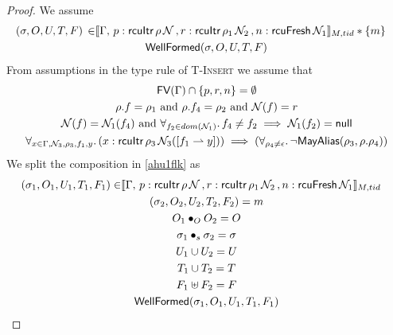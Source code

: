  \begin{proof}
 We assume
\begin{gather}\label{ahu1flk}
  \begin{aligned}
    (\sigma, O, U, T,F) \, \in &  \llbracket \Gamma,\,
 p:\textsf{rcuItr}\, \rho \, \mathcal{N} \, ,
  r:\textsf{rcuItr}\, \rho_1 \, \mathcal{N}_2 \, , n:\textsf{rcuFresh} \, \mathcal{N}_1 \rrbracket_{M,tid} * \{m\}
    \end{aligned} \\
\textsf{WellFormed}(\sigma,O,U,T,F)
\label{ahu2flk}
\end{gather}
From assumptions in the type rule of \textsc{T-Insert} we assume that
\begin{gather}
\textsf{FV}(\Gamma) \cap \{p,r,n\}  =\emptyset 
  \label{ahu3flk} \\
\rho.f  = \rho_1 \text{ and } \rho.f_4  = \rho_2 \text{ and } \mathcal{N}(f) = r
    \label{ahu4flk} \\
\mathcal{N}(f) = \mathcal{N}_1(f_4) \text{ and } \forall_{f_2\in dom(\mathcal{N}_1)} \ldotp f_4 \neq f_2 \implies \mathcal{N}_1(f_2)=\textsf{null}
\label{ahu5flk} \\
\begin{aligned}
  \forall_{x \in \Gamma, \mathcal{N}_3, \rho_3,f_1,y} \ldotp (x:\textsf{rcuItr}\,\rho_3\,\mathcal{N}_3([f_1\rightharpoonup y])) \implies(\forall_{\rho_4\neq \epsilon} \ldotp \neg\mathsf{MayAlias}(\rho_3, \rho.\rho_4) )
\label{ahu6flk}
  \end{aligned}
\end{gather}
We split the composition in  \ref{ahu1flk} as 
\begin{gather} \label{ahu11flk}
  \begin{aligned}
    (\sigma_1, O_{1}, U_{1}, T_{1} ,F_1) \in & \llbracket \Gamma,\,
 p:\textsf{rcuItr}\, \rho \, \N \, ,
  r:\textsf{rcuItr}\, \rho_1 \, \N_2 \, , n:\textsf{rcuFresh} \, \N_1 \rrbracket_{M,tid} \end{aligned}\\
\label{ahu12flk}
(\sigma_2, O_{2}, U_{2}, T_{2},F_2) = m
\\
\label{ahu13flk}
O_{1} \bullet_{O} O_{2} = O
\\
\label{ahusigflk}
\sigma_1 \bullet_s \sigma_2 = \sigma \\
\label{ahu14flk}
U_{1} \cup U_{2} = U
\\
\label{ahu15flk}
T_{1} \cup T_{2} = T
\\
\label{ahuffflk}
F_1 \uplus F_2 = F
\\
\label{ahu16flk}
\textsf{WellFormed}(\sigma_1,O_{1},U_{1},T_{1},F_1)
\\

\end{gather}
\end{proof}
